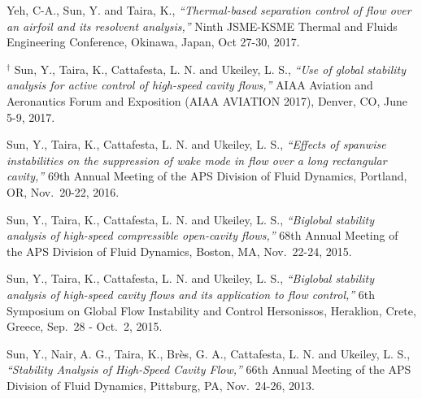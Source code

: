\documentclass[10pt]{article}
\begin{document}
{\begin{etaremune}
\item Yeh, C-A., Sun, Y. and Taira, K., {\it ``Thermal-based separation control of flow over an airfoil and its resolvent analysis,''} Ninth JSME-KSME Thermal and Fluids Engineering Conference, Okinawa, Japan, Oct 27-30, 2017. 

\item $\boldsymbol {^\dagger}$ Sun, Y., Taira, K., Cattafesta, L. N. and Ukeiley, L. S., {\it ``Use of global stability analysis for active control of high-speed cavity flows,''} AIAA Aviation and Aeronautics Forum and Exposition (AIAA AVIATION 2017), Denver, CO, June 5-9, 2017.

\item Sun, Y., Taira, K., Cattafesta, L. N. and Ukeiley, L. S., {\it ``Effects of spanwise instabilities on the suppression of wake mode in flow over a long rectangular cavity,''} 69th Annual Meeting of the APS Division of Fluid Dynamics, Portland, OR, Nov.~20-22, 2016.

\item Sun, Y., Taira, K., Cattafesta, L. N. and Ukeiley, L. S., {\it ``Biglobal stability analysis of high-speed compressible open-cavity flows,''} 68th Annual Meeting of the APS Division of Fluid Dynamics, Boston, MA, Nov.~22-24, 2015.

\item Sun, Y., Taira, K., Cattafesta, L. N. and Ukeiley, L. S., {\it ``Biglobal stability analysis of high-speed cavity flows and its application to flow control,''} 6th Symposium on Global Flow Instability and Control Hersonissos, Heraklion, Crete, Greece, Sep.~28 - Oct.~2, 2015.

\item Sun, Y., Nair, A. G., Taira, K., Br\`es, G. A., Cattafesta, L. N. and Ukeiley, L. S., {\it ``Stability Analysis of High-Speed Cavity Flow,''} 66th Annual Meeting of the APS Division of Fluid Dynamics, Pittsburg, PA, Nov.~24-26, 2013.
\end{etaremune}
}


\end{document}
